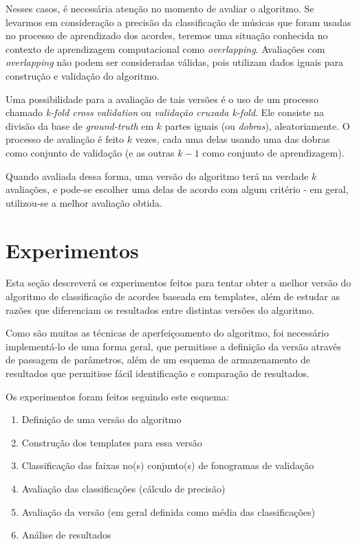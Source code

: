         Nesses casos, é necessária atenção no momento de avaliar o algoritmo. Se levarmos em consideração a precisão da classificação de músicas que foram usadas no processo de aprendizado dos acordes, teremos uma situação conhecida no contexto de aprendizagem computacional como \textit{overlapping}. Avaliações com \textit{overlapping} não podem ser consideradas válidas, pois utilizam dados iguais para construção e validação do algoritmo.
        
        Uma possibilidade para a avaliação de tais versões é o uso de um processo chamado \textit{k-fold cross validation} ou \textit{validação cruzada k-fold}. Ele consiste na divisão da base de \textit{ground-truth} em $k$ partes iguais (ou \textit{dobras}), aleatoriamente. O processo de avaliação é feito $k$ vezes, cada uma delas usando uma das dobras como conjunto de validação (e as outras $k - 1$ como conjunto de aprendizagem).
        
        Quando avaliada dessa forma, uma versão do algoritmo terá na verdade $k$ avaliações, e pode-se escolher uma delas de acordo com algum critério - em geral, utilizou-se a melhor avaliação obtida. 


\section{Experimentos}

    Esta seção descreverá os experimentos feitos para tentar obter a melhor versão do algoritmo de classificação de acordes baseada em templates, além de estudar as razões que diferenciam os resultados entre distintas versões do algoritmo.
    
    Como são muitas as técnicas de aperfeiçoamento do algoritmo, foi necessário implementá-lo de uma forma geral, que permitisse a definição da versão através de passagem de parâmetros, além de um esquema de armazenamento de resultados que permitisse fácil identificação e comparação de resultados.
    
    Os experimentos foram feitos seguindo este esquema:
    
    \begin{enumerate}
        \item Definição de uma versão do algoritmo
        \item Construção dos templates para essa versão
        \item Classificação das faixas no(s) conjunto(s) de fonogramas de validação
        \item Avaliação das classificações (cálculo de precisão)
        \item Avaliação da versão (em geral definida como média das classificações)
        \item Análise de resultados
    \end{enumerate}
    
